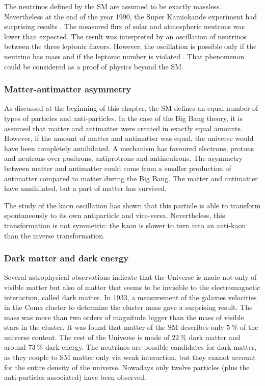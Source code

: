       The neutrinos defined by the \gls{SM} are assumed to be exactly massless.
      Nevertheless at the end of the year 1990, the Super Kamiokande experiment had surprising results \cite{Super-Kamiokande-Oscillation}.
      The measured flux of solar and atmospheric neutrons was lower than expected.
      The result was interpreted by an oscillation of neutrinos between the three leptonic flavors.
      However, the oscillation is possible only if the neutrino has mass and if the leptonic number is violated \cite{Dib}.
      That phenomenon could be considered as a proof of physics beyond the \gls{SM}.

      \subsubsection{Matter-antimatter asymmetry}

      As discussed at the beginning of this chapter, the \gls{SM} defines an equal number of types of particles and anti-particles. 
      In the case of the Big Bang theory, it is assumed that matter and antimatter were created in exactly equal amounts.
      However, if the amount of matter and antimatter was equal, the universe would have been completely annihilated.
      A mechanism has favoured electrons, protons and neutrons over positrons, antiprotrons and antineutrons.
      The asymmetry between matter and antimatter could come from a smaller production of antimatter compared to matter during the Big Bang.
      The matter and antimatter have annihilated, but a part of matter has survived. 

      The study of the kaon oscillation has shown that this particle is able to transform spontaneously to its own antiparticle and vice-versa.
      Nevertheless, this transformation is not symmetric: the kaon is slower to turn into an anti-kaon than the inverse transformation.

      \subsubsection{Dark matter and dark energy}
      
      Several astrophysical observations indicate that the Universe is made not only of visible matter but also of matter that seems to be invisible to the electromagnetic interaction, called dark matter.
      In 1933, a measurement of the galaxies velocities in the Coma cluster to determine the cluster mass gave a surprising result.
      The mass was more than two orders of magnitude bigger than the mass of visible stars in the cluster.
      It was found that  matter of the \gls{SM} describes only $5~\%$ of the universe content. 
      The rest of the Universe is made of $22~\%$ dark matter and around $73~\%$ dark energy.
      The neutrinos are possible candidates for dark matter, as they couple to \gls{SM} matter only via weak interaction, but they cannot account for the entire density of the universe.
      Nowadays only twelve particles (plus the anti-particles associated) have been observed. 

